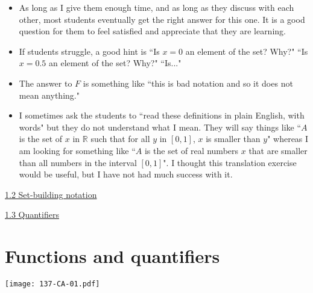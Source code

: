 \documentclass[11pt]{article}
\newcommand{\n}{\newpage}
\newcommand{\nl}{\hfill \vspace{-1.1\baselineskip}} %
\newcommand{\vtwo}{\hspace{8mm} \href{https://www.youtube.com/watch?v=GQfOWN76eTA&list=PLlwePzQY_wW-CPzhk-af-MXj9knthD1gx&index=2}{1.2 Set-building notation}}
\newcommand{\vthree}{\hspace{8mm}\href{https://www.youtube.com/watch?v=XHapWWI_wJ8&list=PLlwePzQY_wW-CPzhk-af-MXj9knthD1gx&index=3}{1.3 Quantifiers}}
\begin{document}
\begin{comments}
\nl
	\begin{itemize}
		\item  As long as I give them enough time, and as long as they discuss with each other, most students eventually get the right answer for this one.  It is a good question for them to feel satisfied and appreciate that they are learning.
		\item If students struggle, a good hint is ``Is $x=0$ an element of the set? Why?"  ``Is $x=0.5$ an element of the set?  Why?" ``Is..."
		\item  The answer to $F$ is something like ``this is bad notation and so it does not mean anything."
		\item I sometimes ask the students to ``read these definitions in plain English, with words" but they do not understand what I mean.  They will say things like ``$A$ is the set of $x$ in $\mathbb{R}$ such that for all $y$ in $[0,1]$, $x$ is smaller than $y$" whereas I am looking for something like ``$A$ is the set of real numbers $x$ that are smaller than all numbers in the interval $[0,1]$".  I thought this translation exercise would be useful, but I have not had much success with it.
	\end{itemize}
\end{comments}

\begin{videos}
\vtwo

\hspace{0.1mm} \vthree

\end{videos}

\n
\newpage
\section{Functions and quantifiers} 

\begin{center}
{ \texttt{[image: 137-CA-01.pdf]}}
\end{center}
\end{document}
